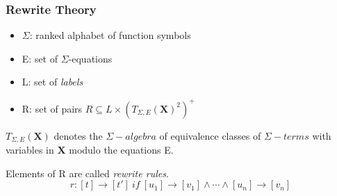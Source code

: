 \documentclass{beamer}
\begin{document}
\begin{frame}
    \frametitle{Rewrite Theory}
    \begin{center}
    \end{center}
    
    \bigskip
    \begin{itemize}

        \item $\Sigma$: ranked alphabet of function symbols
        
        \item E: set  of $\Sigma$-equations 
       
        \item L: set of \emph{labels}
      
        \item R: set of pairs $R \subseteq L \times (T_{\Sigma, E}(\mathbf{X})^2)^+$
    \end{itemize}
    
    \pause
    \bigskip
    $T_{\Sigma,E}(\mathbf{X})$ denotes the $\Sigma-algebra$ of equivalence classes of $\Sigma-terms$ with variables in $\mathbf{X}$ modulo the equations E.
    
    \medskip
    Elements of R are called \emph{rewrite rules}.
    $$r: [t] \rightarrow [t']\ if\ [u_1] \rightarrow [v_1] \wedge \cdots \wedge [u_n] \rightarrow [v_n]$$
\end{frame}


  
 
\end{document}

